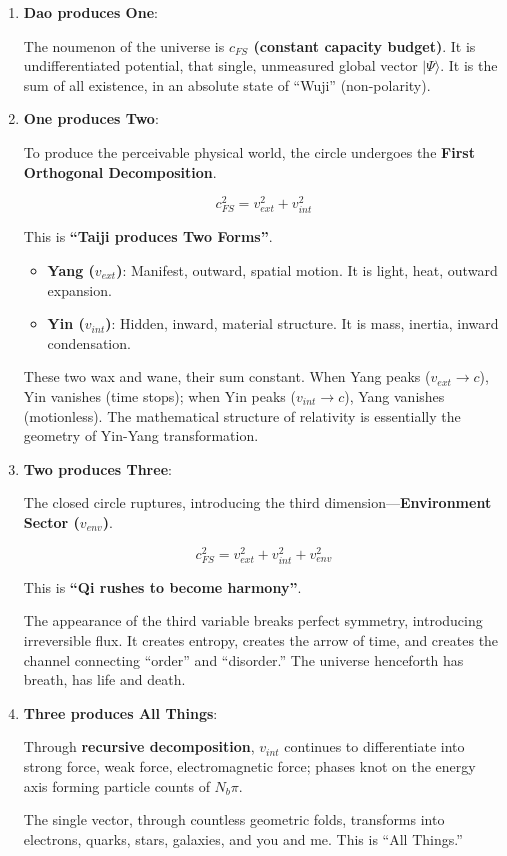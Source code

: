 \begin{enumerate}
\item \textbf{Dao produces One}:

    The noumenon of the universe is \textbf{$c_{FS}$ (constant capacity budget)}. It is undifferentiated potential, that single, unmeasured global vector $|\Psi\rangle$. It is the sum of all existence, in an absolute state of ``Wuji'' (non-polarity).

\item \textbf{One produces Two}:

    To produce the perceivable physical world, the circle undergoes the \textbf{First Orthogonal Decomposition}.

    \[c_{FS}^2 = v_{ext}^2 + v_{int}^2\]

    This is \textbf{``Taiji produces Two Forms''}.

    \begin{itemize}
    \item \textbf{Yang ($v_{ext}$)}: Manifest, outward, spatial motion. It is light, heat, outward expansion.

    \item \textbf{Yin ($v_{int}$)}: Hidden, inward, material structure. It is mass, inertia, inward condensation.
    \end{itemize}

    These two wax and wane, their sum constant. When Yang peaks ($v_{ext} \to c$), Yin vanishes (time stops); when Yin peaks ($v_{int} \to c$), Yang vanishes (motionless). The mathematical structure of relativity is essentially the geometry of Yin-Yang transformation.

\item \textbf{Two produces Three}:

    The closed circle ruptures, introducing the third dimension---\textbf{Environment Sector ($v_{env}$)}.

    \[c_{FS}^2 = v_{ext}^2 + v_{int}^2 + v_{env}^2\]

    This is \textbf{``Qi rushes to become harmony''}.

    The appearance of the third variable breaks perfect symmetry, introducing irreversible flux. It creates entropy, creates the arrow of time, and creates the channel connecting ``order'' and ``disorder.'' The universe henceforth has breath, has life and death.

\item \textbf{Three produces All Things}:

    Through \textbf{recursive decomposition}, $v_{int}$ continues to differentiate into strong force, weak force, electromagnetic force; phases knot on the energy axis forming particle counts of $N_b \pi$.

    The single vector, through countless geometric folds, transforms into electrons, quarks, stars, galaxies, and you and me. This is ``All Things.''
\end{enumerate}

